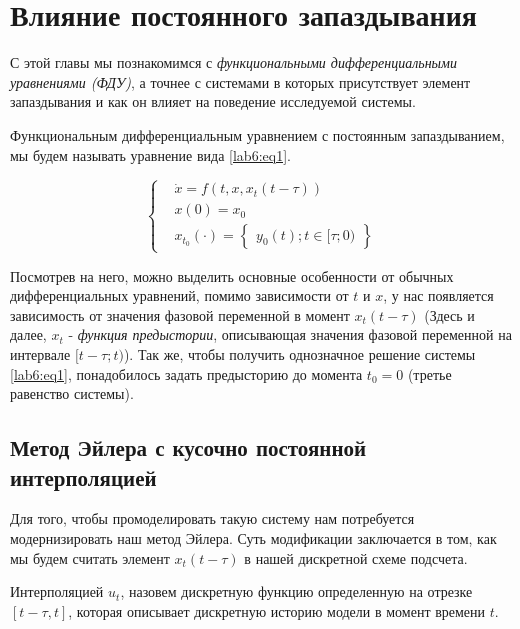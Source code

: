 \chapter{Влияние постоянного запаздывания}\label{lab6}

С этой главы мы познакомимся с \textit{функциональными дифференциальными
уравнениями (ФДУ)}, а точнее с системами в которых присутствует элемент
запаздывания и как он влияет на поведение исследуемой системы.

\begin{definition}
    Функциональным дифференциальным уравнением с постоянным запаздыванием,
    мы будем называть уравнение вида \ref{lab6:eq1}.
\end{definition}

\begin{equation}\label{lab6:eq1}
    \begin{cases}
        &\dot{x} = f(t, x, x_t(t - \tau)) \\
        &x(0) = x_0 \\
        &x_{t_0}(\cdot) = \begin{Bmatrix}y_0(t); t \in [\tau;0)\end{Bmatrix}
    \end{cases}
\end{equation}

Посмотрев на него, можно выделить основные особенности от обычных дифференциальных
уравнений, помимо зависимости от $t$ и $x$, у нас появляется зависимость от
значения фазовой переменной в момент $x_t(t-\tau)$ (Здесь и далее, $x_t$ - \textit{функция
предыстории}, описывающая значения фазовой переменной на интервале $[t-\tau;t)$).
Так же, чтобы получить однозначное решение системы \ref{lab6:eq1}, понадобилось
задать предысторию до момента $t_0 = 0$ (третье равенство системы).

\section{Метод Эйлера с кусочно постоянной интерполяцией}
Для того, чтобы промоделировать такую систему нам потребуется
модернизировать наш метод Эйлера. Суть модификации заключается
в том, как мы будем считать элемент $x_t(t - \tau)$ в нашей
дискретной схеме подсчета.

\begin{definition}
    Интерполяцией $u_t$, назовем дискретную функцию определенную на отрезке
    $[t-\tau, t]$, которая описывает дискретную историю модели в момент времени
    $t$.
\end{definition}

